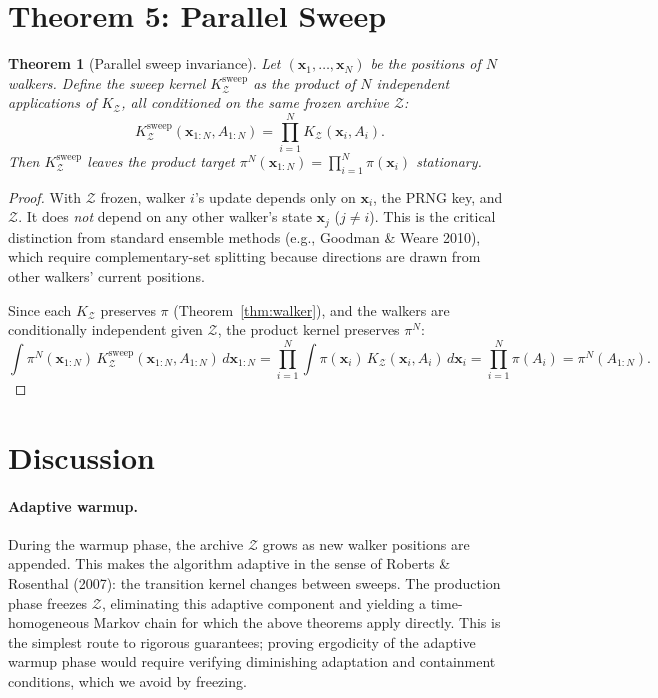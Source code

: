 \documentclass[12pt]{article}
\newtheorem{theorem}{Theorem}
\newcommand{\Zmat}{\mathcal{Z}}
\newcommand{\bx}{\mathbf{x}}
\begin{document}
\section*{Theorem 5: Parallel Sweep}

\begin{theorem}[Parallel sweep invariance]
\label{thm:sweep}
Let $(\bx_1, \ldots, \bx_N)$ be the positions of $N$ walkers. Define
the sweep kernel $K_\Zmat^{\mathrm{sweep}}$ as the product of $N$
independent applications of $K_\Zmat$, all conditioned on the same
frozen archive $\Zmat$:
\[
    K_\Zmat^{\mathrm{sweep}}(\bx_{1:N}, A_{1:N})
    = \prod_{i=1}^N K_\Zmat(\bx_i, A_i).
\]
Then $K_\Zmat^{\mathrm{sweep}}$ leaves the product target
$\pi^N(\bx_{1:N}) = \prod_{i=1}^N \pi(\bx_i)$ stationary.
\end{theorem}

\begin{proof}
With $\Zmat$ frozen, walker $i$'s update depends only on $\bx_i$, the
PRNG key, and $\Zmat$. It does \emph{not} depend on any other walker's
state $\bx_j$ ($j \neq i$). This is the critical distinction from
standard ensemble methods (e.g., Goodman \& Weare 2010), which require
complementary-set splitting because directions are drawn from other
walkers' current positions.

Since each $K_\Zmat$ preserves $\pi$ (Theorem~\ref{thm:walker}), and
the walkers are conditionally independent given $\Zmat$, the product
kernel preserves $\pi^N$:
\[
    \int \pi^N(\bx_{1:N})\, K_\Zmat^{\mathrm{sweep}}(\bx_{1:N},
    A_{1:N})\, d\bx_{1:N}
    = \prod_{i=1}^N \int \pi(\bx_i)\, K_\Zmat(\bx_i, A_i)\, d\bx_i
    = \prod_{i=1}^N \pi(A_i) = \pi^N(A_{1:N}).
\]
\end{proof}

\section*{Discussion}

\paragraph{Adaptive warmup.}
During the warmup phase, the archive $\Zmat$ grows as new walker
positions are appended. This makes the algorithm adaptive in the sense
of Roberts \& Rosenthal (2007): the transition kernel changes between
sweeps. The production phase freezes $\Zmat$, eliminating this
adaptive component and yielding a time-homogeneous Markov chain for
which the above theorems apply directly. This is the simplest route to
rigorous guarantees; proving ergodicity of the adaptive warmup phase
would require verifying diminishing adaptation and containment
conditions, which we avoid by freezing.
\end{document}
